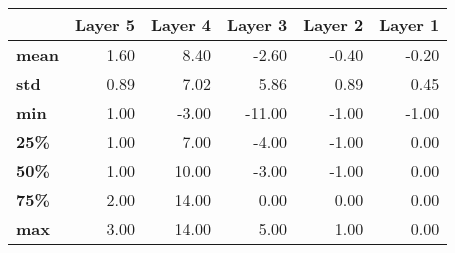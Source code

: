 \begin{tabular}{lrrrrr}
\toprule
{} &  Layer 5 &  Layer 4 &  Layer 3 &  Layer 2 &  Layer 1 \\
\midrule
\textbf{mean} &     1.60 &     8.40 &    -2.60 &    -0.40 &    -0.20 \\
\textbf{std } &     0.89 &     7.02 &     5.86 &     0.89 &     0.45 \\
\textbf{min } &     1.00 &    -3.00 &   -11.00 &    -1.00 &    -1.00 \\
\textbf{25\% } &     1.00 &     7.00 &    -4.00 &    -1.00 &     0.00 \\
\textbf{50\% } &     1.00 &    10.00 &    -3.00 &    -1.00 &     0.00 \\
\textbf{75\% } &     2.00 &    14.00 &     0.00 &     0.00 &     0.00 \\
\textbf{max } &     3.00 &    14.00 &     5.00 &     1.00 &     0.00 \\
\bottomrule
\end{tabular}
